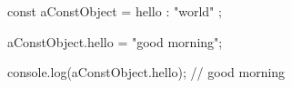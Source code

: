 const aConstObject = {
    hello : "world"
};

aConstObject.hello = "good morning";

console.log(aConstObject.hello);
// good morning
